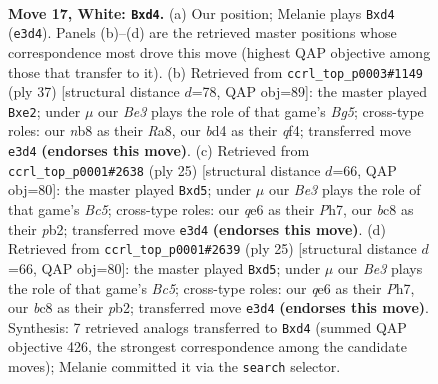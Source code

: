 \documentclass[11pt]{article}
\begin{document}
\clearpage

\begin{figure}[p]\centering
\begin{subfigure}{0.46\textwidth}\centering
\resizebox{\linewidth}{!}{%
\newchessgame
\chessboard[
  setfen={rnb1k2r/1p6/3pq1p1/p4p1p/3b4/2N1B3/PPP2PPP/R2Q1KR1 w kq - 0 17},
  showmover=false,
  pgfstyle=straightmove, color=movearrow, markmove={e3-d4}
]}
\caption{}
\end{subfigure}\hfill
\begin{subfigure}{0.46\textwidth}\centering
\resizebox{\linewidth}{!}{%
\newchessgame
\chessboard[
  setfen={r2q1rk1/5ppp/p2p4/1p2n3/4PQbP/2P1N3/PP2BP2/R3K2R b KQ - 1 19},
  showmover=false,
  pgfstyle=straightmove, color=movearrow, markmove={g4-e2}
]}
\caption{}
\end{subfigure}
\\[4pt]
\begin{subfigure}{0.46\textwidth}\centering
\resizebox{\linewidth}{!}{%
\newchessgame
\chessboard[
  setfen={r3k2r/pp2qppp/2np4/3B4/2b5/4P1P1/PP1Q1P1P/R3K1NR b KQkq - 1 13},
  showmover=false,
  pgfstyle=straightmove, color=movearrow, markmove={c4-d5}
]}
\caption{}
\end{subfigure}\hfill
\begin{subfigure}{0.46\textwidth}\centering
\resizebox{\linewidth}{!}{%
\newchessgame
\chessboard[
  setfen={r3k2r/pp2qppp/2np4/3B4/2b5/4P1P1/PP1Q1P1P/R3K1NR b KQkq - 1 13},
  showmover=false,
  pgfstyle=straightmove, color=movearrow, markmove={c4-d5}
]}
\caption{}
\end{subfigure}
\caption{\textbf{Move 17, White: \texttt{Bxd4}.} (a) Our position; Melanie plays \texttt{Bxd4} (\texttt{e3d4}). Panels (b)--(d) are the retrieved master positions whose correspondence most drove this move (highest QAP objective among those that transfer to it). (b) Retrieved from \texttt{ccrl\_top\_p0003\#1149} (ply 37) [structural distance $d$=78, QAP obj=89]: the master played \texttt{Bxe2}; under $\mu$ our \emph{Be3} plays the role of that game's \emph{Bg5}; cross-type roles: our \emph{n}b8 as their \emph{R}a8, our \emph{b}d4 as their \emph{q}f4; transferred move \texttt{e3d4} \textbf{(endorses this move)}. (c) Retrieved from \texttt{ccrl\_top\_p0001\#2638} (ply 25) [structural distance $d$=66, QAP obj=80]: the master played \texttt{Bxd5}; under $\mu$ our \emph{Be3} plays the role of that game's \emph{Bc5}; cross-type roles: our \emph{q}e6 as their \emph{P}h7, our \emph{b}c8 as their \emph{p}b2; transferred move \texttt{e3d4} \textbf{(endorses this move)}. (d) Retrieved from \texttt{ccrl\_top\_p0001\#2639} (ply 25) [structural distance $d$=66, QAP obj=80]: the master played \texttt{Bxd5}; under $\mu$ our \emph{Be3} plays the role of that game's \emph{Bc5}; cross-type roles: our \emph{q}e6 as their \emph{P}h7, our \emph{b}c8 as their \emph{p}b2; transferred move \texttt{e3d4} \textbf{(endorses this move)}. Synthesis: 7 retrieved analogs transferred to \texttt{Bxd4} (summed QAP objective 426, the strongest correspondence among the candidate moves); Melanie committed it via the \texttt{search} selector.}
\label{fig:thought-m32}
\end{figure}
\end{document}
